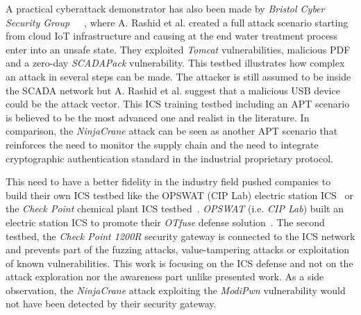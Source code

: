 A practical cyberattack demonstrator has also been made by \emph{Bristol Cyber Security Group}~\cite{Gardiner19}~\cite{Craggs19}~\cite{Rashid20}, where A. Rashid et al. created a full attack scenario starting from cloud IoT infrastructure and causing at the end water treatment process enter into an unsafe state. They exploited \emph{Tomcat} vulnerabilities, malicious PDF and a zero-day \emph{SCADAPack} vulnerability. This testbed illustrates how complex an attack in several steps can be made. The attacker is still assumed to be inside the SCADA network but A. Rashid et al. suggest that a malicious USB device could be the attack vector. This ICS training testbed including an APT scenario is believed to be the most advanced one and realist in the literature. In comparison, the \emph{NinjaCrane} attack can be seen as another APT scenario that reinforces the need to monitor the supply chain and the need to integrate cryptographic authentication standard in the industrial proprietary protocol. 

This need to have a better fidelity in the industry field pushed companies to build their own ICS testbed like the OPSWAT (CIP Lab) electric station ICS~\cite{opswat22} or the \emph{Check Point} chemical plant ICS testbed~\cite{checkpoint2023}. \emph{OPSWAT} (i.e. \emph{CIP Lab}) built an electric station ICS to promote their \emph{OTfuse} defense solution~\cite{opswat22}. The second testbed, the \emph{Check Point 1200R} security gateway is connected to the ICS network and prevents part of the fuzzing attacks, value-tampering attacks or exploitation of known vulnerabilities. This work is focusing on the ICS defense and not on the attack exploration nor the awareness part unlike presented work. As a side observation, the \emph{NinjaCrane} attack exploiting the \emph{ModiPwn} vulnerability would not have been detected by their security gateway.

